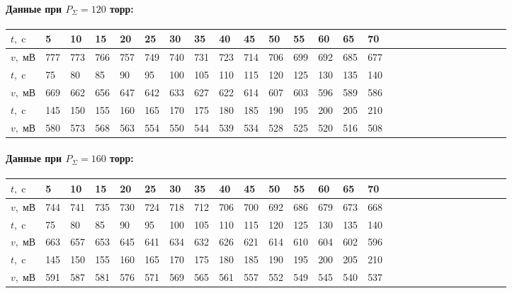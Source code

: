 \documentclass[a4paper,12pt]{article}
\begin{document}
\begin{enumerate}
\paragraph{Данные при $P_{\Sigma} = 120$ торр:}
\begin{center}
\begin{tabular}{|l||l|l|l|l|l|l|l|l|l|l|l|l|l|l|l|l|l|l|l|l|l|l|l|l|l|l|}
\hline
$t,\; \text{c}$ & 5 & 10 & 15 & 20 & 25 & 30 & 35 & 40 & 45 & 50 & 55 & 60 & 65 & 70 \\ 
\hline
$v, \; \text{мВ}$ & 777 & 773 & 766 & 757 & 749 & 740 & 731 & 723 & 714 & 706 & 699 & 692 & 685 & 677 \\ 
\hline
\hline
$t,\; \text{c}$ & 75 & 80 & 85 & 90 & 95 & 100 & 105 & 110 & 115 & 120 & 125 & 130 & 135 & 140\\ 
\hline
$v, \; \text{мВ}$ & 669 & 662 & 656 & 647 & 642 & 633 & 627 & 622 & 614 & 607 & 603 & 596 & 589 & 586 \\ 
\hline
\hline
$t,\; \text{c}$ & 145 & 150 & 155 & 160 & 165 & 170 & 175 & 180 & 185 & 190 & 195 & 200 & 205 & 210 \\ 
\hline
$v, \; \text{мВ}$ & 580 & 573 & 568 & 563 & 554 & 550 & 544 & 539 & 534 & 528 & 525 & 520 & 516 & 508\\ 
\hline
\end{tabular}
\end{center}
\paragraph{Данные при $P_{\Sigma} = 160$ торр:}
\begin{center}
\begin{tabular}{|l||l|l|l|l|l|l|l|l|l|l|l|l|l|l|l|l|l|l|l|l|l|l|l|l|l|l|}
\hline
$t,\; \text{c}$ & 5 & 10 & 15 & 20 & 25 & 30 & 35 & 40 & 45 & 50 & 55 & 60 & 65 & 70 \\ 
\hline
$v, \; \text{мВ}$ & 744 & 741 & 735 & 730 & 724 & 718 & 712 & 706 & 700 & 692 & 686 & 679 & 673 & 668 \\ 
\hline
\hline
$t,\; \text{c}$ & 75 & 80 & 85 & 90 & 95 & 100 & 105 & 110 & 115 & 120 & 125 & 130 & 135 & 140 \\ 
\hline
$v, \; \text{мВ}$ & 663 & 657 & 653 & 645 & 641 & 634 & 632 & 626 & 621 & 614 & 610 & 604 & 602 & 596 \\ 
\hline
\hline
$t,\; \text{c}$ & 145 & 150 & 155 & 160 & 165 & 170 & 175 & 180 & 185 & 190 & 195 & 200 & 205 & 210 \\ 
\hline
$v, \; \text{мВ}$ & 591 & 587 & 581 & 576 & 571 & 569 & 565 & 561 & 557 & 552 & 549 & 545 & 540 & 537 \\ 
\hline
\end{tabular}
\end{center}

\end{enumerate}
\end{document}
